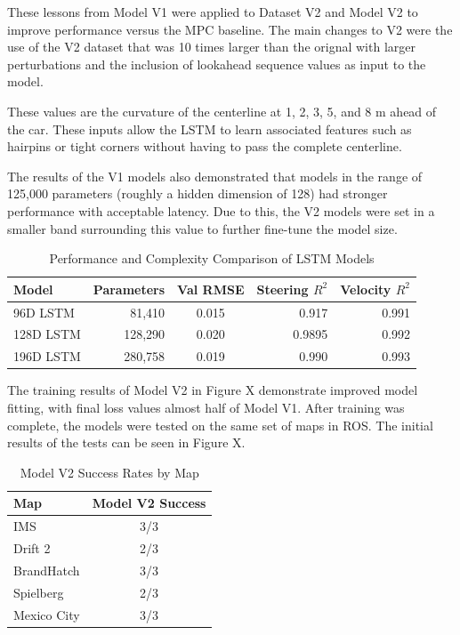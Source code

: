 \documentclass[conference]{IEEEtran}
\begin{document}
These lessons from Model V1 were applied to Dataset V2 and Model V2 to improve performance versus the MPC baseline. The main changes to V2 were the use of the V2 dataset that was 10 times larger than the orignal with larger perturbations and the inclusion of lookahead sequence values as input to the model.

These values are the curvature of the centerline at 1, 2, 3, 5, and 8 m ahead of the car. These inputs allow the LSTM to learn associated features such as hairpins or tight corners without having to pass the complete centerline.

The results of the V1 models also demonstrated that models in the range of 125,000 parameters (roughly a hidden dimension of 128) had stronger performance with acceptable latency. Due to this, the V2 models were set in a smaller band surrounding this value to further fine-tune the model size. 

\begin{table}[htbp]
    \centering
    \caption{Performance and Complexity Comparison of LSTM Models}
    \label{tab:lstm_comparison}
    \begin{tabular}{lrcrr}
        \toprule
        \textbf{Model} & \textbf{Parameters} &Val RMSE} & \textbf{Steering $R^2$} & \textbf{Velocity $R^2$} \\
        \midrule
        96D LSTM  & 81,410    & 0.015 & 0.917 & 0.991 \\
        128D LSTM & 128,290   & 0.020 & 0.9895 & 0.992 \\
        196D LSTM & 280,758 & 0.019 & 0.990 & 0.993 \\
        \bottomrule
    \end{tabular}
\end{table}

The training results of Model V2 in Figure X demonstrate improved model fitting, with final loss values almost half of Model V1. After training was complete, the models were tested on the same set of maps in ROS. The initial results of the tests can be seen in Figure X.

\begin{table}[htbp]
    \centering
    \caption{Model V2 Success Rates by Map}
    \label{tab:model_v2}
    \begin{tabular}{lc}
        \toprule
        \textbf{Map} & \textbf{Model V2 Success} \\
        \midrule
        IMS         & 3/3 \\
        Drift 2     & 2/3 \\
        BrandHatch  & 3/3 \\
        Spielberg   & 2/3 \\
        Mexico City & 3/3 \\
        \bottomrule
    \end{tabular}
\end{table}
\end{document}
